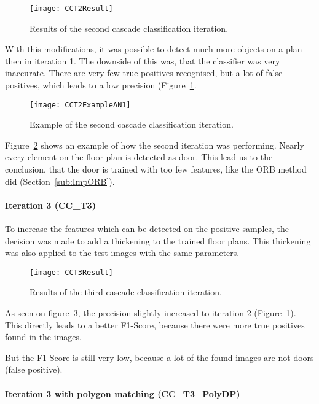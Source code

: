 \begin{figure}[H]
	\centering
	\texttt{[image: CCT2Result]}
	\caption{Results of the second cascade classification iteration.}
	\label{fig:CCT2Result}
\end{figure}

With this modifications, it was possible to detect much more objects on a plan then in iteration 1. The downside of this was, that the classifier was very inaccurate. There are very few true positives recognised, but a lot of false positives, which leads to a low precision (Figure~\ref{fig:CCT2Result}.

\begin{figure}[H]
	\centering
	\texttt{[image: CCT2ExampleAN1]}
	\caption{Example of the second cascade classification iteration.}
	\label{fig:CCT2ExampleAN1}
\end{figure}

Figure~\ref{fig:CCT2ExampleAN1} shows an example of how the second iteration was performing. Nearly every element on the floor plan is detected as door. This lead us to the conclusion, that the door is trained with too few features, like the ORB method did (Section~\ref{sub:ImpORB}).

\paragraph{Iteration 3 (CC\_T3)}
\label{sub:CCT3}

To increase the features which can be detected on the positive samples, the decision was made to add a thickening to the trained floor plans. This thickening was also applied to the test images with the same parameters.

\begin{figure}[H]
	\centering
	\texttt{[image: CCT3Result]}
	\caption{Results of the third cascade classification iteration.}
	\label{fig:CCT3Result}
\end{figure}

As seen on figure~\ref{fig:CCT3Result}, the precision slightly increased to iteration 2 (Figure~\ref{fig:CCT2Result}). This directly leads to a better F1-Score, because there were more true positives found in the images.

But the F1-Score is still very low, because a lot of the found images are not doors (false positive).

\paragraph{Iteration 3 with polygon matching (CC\_T3\_PolyDP)}
\label{sub:CCT3PolyDP}
\label{sub:PolyDP}

